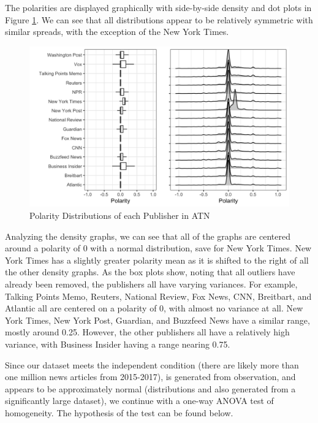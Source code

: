 \documentclass[12pt]{article}
\begin{document}
The polarities are displayed graphically with side-by-side density and dot plots in Figure \ref{fig:PubPol_Dist}. We can see that all distributions appear to be relatively symmetric with similar spreads, with the exception of the New York Times. 

\begin{figure}[H]
    \centering
    \includegraphics[width=1\textwidth]{images/PubPol_Dist.png}
    \caption{Polarity Distributions of each Publisher in ATN}
    \label{fig:PubPol_Dist}
\end{figure}

Analyzing the density graphs, we can see that all of the graphs are centered around a polarity of 0 with a normal distribution, save for New York Times. New York Times has a slightly greater polarity mean as it is shifted to the right of all the other density graphs. As the box plots show, noting that all outliers have already been removed, the publishers all have varying variances. For example, Talking Points Memo, Reuters, National Review, Fox News, CNN, Breitbart, and Atlantic all are centered on a polarity of 0, with almost no variance at all. New York Times, New York Post, Guardian, and Buzzfeed News have a similar range, mostly around 0.25. However, the other publishers all have a relatively high variance, with Business Insider having a range nearing 0.75.

Since our dataset meets the independent condition (there are likely more than one million news articles from 2015-2017), is generated from observation, and appears to be approximately normal (distributions and also generated from a significantly large dataset), we continue with a one-way ANOVA test of homogeneity. The hypothesis of the test can be found below.
\end{document}
